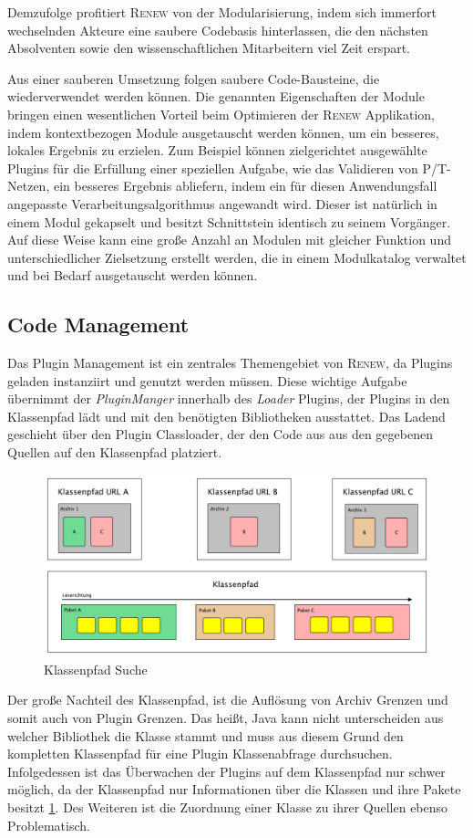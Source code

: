 		Demzufolge profitiert \textsc{Renew} von der Modularisierung, indem sich immerfort wechselnden Akteure eine saubere Codebasis hinterlassen, die den nächsten Absolventen sowie den wissenschaftlichen Mitarbeitern viel Zeit erspart. \bigbreak

		Aus einer sauberen Umsetzung folgen saubere Code-Bausteine, die wiederverwendet werden können. Die genannten Eigenschaften der Module bringen einen wesentlichen Vorteil beim Optimieren der \textsc{Renew} Applikation, indem kontextbezogen Module ausgetauscht werden können, um ein besseres, lokales Ergebnis zu erzielen. Zum Beispiel können zielgerichtet ausgewählte Plugins für die Erfüllung einer speziellen Aufgabe, wie das Validieren von P/T-Netzen, ein besseres Ergebnis abliefern, indem ein für diesen Anwendungsfall angepasste Verarbeitungsalgorithmus angewandt wird. Dieser ist natürlich in einem Modul gekapselt und besitzt Schnittstein identisch zu seinem Vorgänger. Auf diese Weise kann eine große Anzahl an Modulen mit gleicher Funktion und unterschiedlicher Zielsetzung erstellt werden, die in einem Modulkatalog verwaltet und bei Bedarf ausgetauscht werden können.

	\subsection{Code Management}\label{sub:code_managment}
		Das Plugin Management ist ein zentrales Themengebiet von \textsc{Renew}, da Plugins geladen instanziirt und genutzt werden müssen. Diese wichtige Aufgabe übernimmt der \textit{PluginManger} innerhalb des \textit{Loader} Plugins, der Plugins in den Klassenpfad lädt und mit den benötigten Bibliotheken ausstattet. Das Ladend geschieht über den Plugin Classloader, der den Code aus aus den gegebenen Quellen auf den Klassenpfad platziert.\bigbreak
		\begin{figure}[t]
		  \centering
		  \includegraphics[width=\textwidth]{material/images/Klassenpfad.pdf}
		  \caption{Klassenpfad Suche}
		  \label{fig:CP_Struktur}
		\end{figure}
		Der große Nachteil des Klassenpfad, ist die Auflösung von Archiv Grenzen und somit auch von Plugin Grenzen. Das heißt, Java kann nicht unterscheiden aus welcher Bibliothek die Klasse stammt und muss aus diesem Grund den kompletten Klassenpfad für eine Plugin Klassenabfrage durchsuchen. Infolgedessen ist das Überwachen der Plugins auf dem Klassenpfad nur schwer möglich, da der Klassenpfad nur Informationen über die Klassen und ihre Pakete besitzt \ref{fig:CP_Struktur}. Des Weiteren ist die Zuordnung einer Klasse zu ihrer Quellen ebenso Problematisch.\bigbreak

